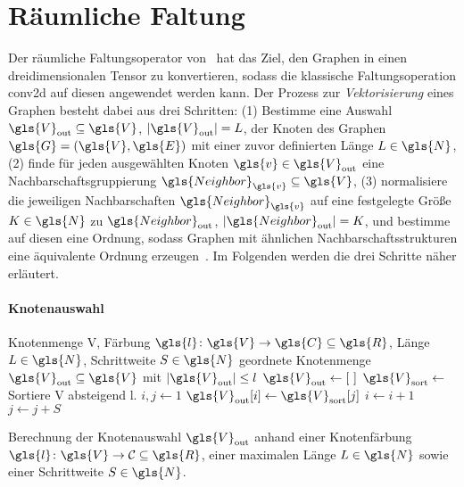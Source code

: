 \section{Räumliche Faltung}
\label{raeumliche_faltung}

Der räumliche Faltungsoperator von~\citeauthor{patchy} hat das Ziel, den Graphen in einen dreidimensionalen Tensor zu konvertieren, sodass die klassische Faltungsoperation \gls{conv2d} auf diesen angewendet werden kann.
Der Prozess zur \emph{Vektorisierung} eines Graphen besteht dabei aus drei Schritten: (1) Bestimme eine Auswahl $\gls{V}_{\mathrm{out}} \subseteq \gls{V}$, $\left|\gls{V}_{\mathrm{out}}\right| = L$, der Knoten des Graphen $\gls{G} = \left(\gls{V}, \gls{E}\right)$ mit einer zuvor definierten Länge $L \in \gls{N}$, (2) finde für jeden ausgewählten Knoten $\gls{v} \in \gls{V}_{\mathrm{out}}$ eine Nachbarschaftsgruppierung $\gls{Neighbor}_{\gls{v}} \subseteq \gls{V}$, (3) normalisiere die jeweiligen Nachbarschaften $\gls{Neighbor}_{\gls{v}}$ auf eine festgelegte Größe $K \in \gls{N}$ zu $\gls{Neighbor}_{\mathrm{out}}$, $\left|\gls{Neighbor}_{\mathrm{out}}\right| = K$, und bestimme auf diesen eine Ordnung, sodass Graphen mit ähnlichen Nachbarschaftsstrukturen eine äquivalente Ordnung erzeugen~\cite{patchy}.
Im Folgenden werden die drei Schritte näher erläutert.

\paragraph{Knotenauswahl}
\label{knotenauswahl}

\begin{algorithm}[t]
\centering
\begin{algorithmic}
  \REQUIRE{} Knotenmenge \gls{V}, Färbung $\gls{l} \colon \gls{V} \to \gls{C} \subseteq \gls{R}$, Länge $L \in \gls{N}$, Schrittweite $S \in \gls{N}$
  \ENSURE{} geordnete Knotenmenge $\gls{V}_{\mathrm{out}} \subseteq \gls{V}$ mit $\left|\gls{V}_{\mathrm{out}}\right| \leq l$
  \STATE{} $\gls{V}_\mathrm{out} \leftarrow \left[\,\,\right]$
  \STATE{} $\gls{V}_{\mathrm{sort}} \leftarrow$ Sortiere \gls{V} absteigend \bzgl{} \gls{l}.
  \STATE{} $i, j \leftarrow 1$
      \STATE{} $\gls{V}_{\mathrm{out}}\left[i\right] \leftarrow \gls{V}_{\mathrm{sort}}\left[j\right]$
    \ENDIF{}
    \STATE{} $i \leftarrow i + 1$
    \STATE{} $j \leftarrow j + S$
  \ENDWHILE{}
\end{algorithmic}
\caption[Knotenauswahl]{Berechnung der Knotenauswahl $\gls{V}_{\mathrm{out}}$ anhand einer Knotenfärbung $\gls{l} \colon \gls{V} \to \mathcal{C} \subseteq \gls{R}$, einer maximalen Länge $L\in\gls{N}$ sowie einer Schrittweite $S \in \gls{N}$.}
\label{alg:knotenauswahl}
\end{algorithm}


